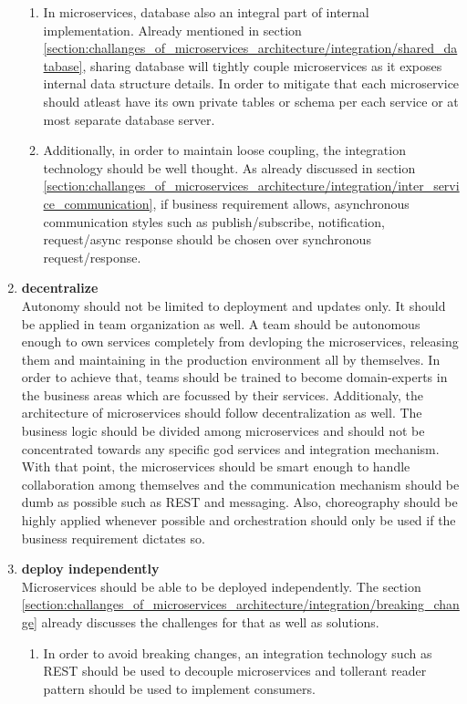 \begin{enumerate}
\begin{enumerate}
\item In microservices, database also an integral part of internal implementation. Already mentioned in section \ref{section:challanges_of_microservices_architecture/integration/shared_database}, sharing database will tightly couple microservices as it exposes internal data structure details. In order to mitigate that each microservice should atleast have its own private tables or schema per each service or at most separate database server.
\item Additionally, in order to maintain loose coupling, the integration technology should be well thought. As already discussed in section \ref{section:challanges_of_microservices_architecture/integration/inter_service_communication}, if business requirement allows, asynchronous communication styles such as publish/subscribe, notification, request/async response should be chosen over synchronous request/response.
\end{enumerate}
\item \textbf{decentralize} \\
Autonomy should not be limited to deployment and updates only. It should be applied in team organization as well. A team should be autonomous enough to own services completely from devloping the microservices, releasing them and maintaining in the production environment all by themselves. In order to achieve that, teams should be trained to become domain-experts in the business areas which are focussed by their services.
Additionaly, the architecture of microservices should follow decentralization as well. The business logic should be divided among microservices and should not be concentrated towards any specific god services and integration mechanism. With that point, the microservices should be smart enough to handle collaboration among themselves and the communication mechanism should be dumb as possible such as \acrshort{REST} and messaging. Also, choreography should be highly applied whenever possible and orchestration should only be used if the business requirement dictates so.
\item \textbf{deploy independently}\\
Microservices should be able to be deployed independently. The section \ref{section:challanges_of_microservices_architecture/integration/breaking_change} already discusses the challenges for that as well as solutions.
\begin{enumerate}
\item In order to avoid breaking changes, an integration technology such as \acrshort{REST} should be used to decouple microservices and tollerant reader pattern should be used to implement consumers.

\end{enumerate}
\end{enumerate}
